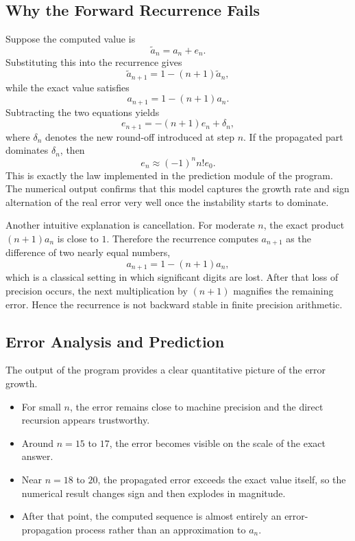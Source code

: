 \documentclass[12pt,a4paper]{article}
\begin{document}
\subsection*{Why the Forward Recurrence Fails}

Suppose the computed value is
\begin{equation}
    \widetilde{a}_n = a_n + e_n.
\end{equation}
Substituting this into the recurrence gives
\begin{equation}
    \widetilde{a}_{n+1} = 1 - (n+1)\widetilde{a}_n,
\end{equation}
while the exact value satisfies
\begin{equation}
    a_{n+1} = 1 - (n+1)a_n.
\end{equation}
Subtracting the two equations yields
\begin{equation}
    e_{n+1} = -(n+1)e_n + \delta_n,
\end{equation}
where $\delta_n$ denotes the new round-off introduced at step $n$. If the propagated part dominates $\delta_n$, then
\begin{equation}
    e_n \approx (-1)^n n! e_0.
\end{equation}
This is exactly the law implemented in the prediction module of the program. The numerical output confirms that this model captures the growth rate and sign alternation of the real error very well once the instability starts to dominate.

Another intuitive explanation is cancellation. For moderate $n$, the exact product $(n+1)a_n$ is close to $1$. Therefore the recurrence computes $a_{n+1}$ as the difference of two nearly equal numbers,
\begin{equation}
    a_{n+1} = 1 - (n+1)a_n,
\end{equation}
which is a classical setting in which significant digits are lost. After that loss of precision occurs, the next multiplication by $(n+1)$ magnifies the remaining error. Hence the recurrence is not backward stable in finite precision arithmetic.

\subsection*{Error Analysis and Prediction}

The output of the program provides a clear quantitative picture of the error growth.
\begin{itemize}
    \item For small $n$, the error remains close to machine precision and the direct recursion appears trustworthy.
    \item Around $n=15$ to $17$, the error becomes visible on the scale of the exact answer.
    \item Near $n=18$ to $20$, the propagated error exceeds the exact value itself, so the numerical result changes sign and then explodes in magnitude.
    \item After that point, the computed sequence is almost entirely an error-propagation process rather than an approximation to $a_n$.
\end{itemize}
\end{document}
